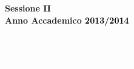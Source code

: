 \documentclass[12pt,a4paper]{report}
\begin{document}
\begin{titlepage}
\vspace{17mm}

\begin{center}
%
%
{\large{\bf Sessione \textcolor{black}{II }
\vspace{2mm}\\
%
%
Anno Accademico \textcolor{black}{ 2013/2014}}}
\end{center}

\thispagestyle{empty}
\textcolor{white}{.}\\
\pagebreak 

\thispagestyle{empty}
\textcolor{white}{.}\\
\pagebreak 

\end{titlepage}
\end{document}
